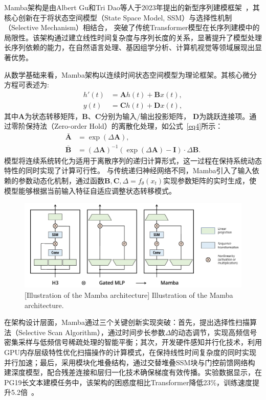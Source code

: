 Mamba架构是由Albert Gu和Tri Dao等人于2023年提出的新型序列建模框架~\cite{gu2023mamba}，其核心创新在于将状态空间模型（State Space Model, SSM）与选择性机制（Selective Mechanism）相结合，
突破了传统Transformer模型在长序列建模中的局限性。该架构通过建立线性时间复杂度与序列长度的关系，显著提升了模型处理长序列依赖的能力，在自然语言处理、基因组学分析、计算机视觉等领域展现出显著优势。

从数学基础来看，Mamba架构以连续时间状态空间模型为理论框架。其核心微分方程可表述为:
\begin{equation}
\begin{aligned}
    h'(t)&=\mathbf{A}h(t)+\mathbf{B}x(t),\\
    y(t)&=\mathbf{C}h(t) +\mathbf{D}x(t),
\end{aligned}
\label{eq3}
\end{equation}
其中$\mathbf{A}$为状态转移矩阵，$\mathbf{B}$、$\mathbf{C}$分别为输入/输出投影矩阵， $\mathbf{D}$为跳跃连接项。通过零阶保持法（Zero-order Hold）的离散化处理，如公式~\ref{eq4}所示：
\begin{equation}
\begin{aligned}
    \mathbf{\bar{A}}&=\exp(\Delta\mathbf{A}),\\
    \mathbf{\bar{B}}&=(\Delta\mathbf{A})^{-1}(\exp(\Delta\mathbf{A})-\mathbf{I})\cdot\Delta\mathbf{B}.
\end{aligned}
\label{eq4}
\end{equation}
模型将连续系统转化为适用于离散序列的递归计算形式，这一过程在保持系统动态特性的同时实现了计算可行性。
与传统递归神经网络不同，Mamba引入了输入依赖的参数动态化机制，通过函数$\mathbf{B},\mathbf{C},\Delta=f_\theta(x_t)$实现参数矩阵的实时生成，使模型能够根据当前输入特征自适应调整状态转移模式。

\begin{figure}[h]
    \centering
    \includegraphics[width=1.0\columnwidth]{figures/RelatedWork/Mamba架构.png}
    [Illustration of the Mamba architecture]{ Illustration of the Mamba architecture.~\cite{gu2023mamba}}
    \label{figure1: Mamba架构示意图}
\end{figure}
在架构设计层面，Mamba通过三个关键创新实现突破：首先，提出选择性扫描算法（Selective Scan Algorithm），通过时间步长参数$\Delta$的动态调节，实现高频信号密集采样与低频信号稀疏处理的智能平衡；其次，开发硬件感知并行化技术，利用GPU内存层级特性优化扫描操作的计算模式，在保持线性时间复杂度的同时实现并行加速；最后，采用模块化堆叠结构，通过交替堆叠SSM块与门控前馈网络构建深度模型，配合残差连接和层归一化技术确保梯度有效传播。实验数据显示，在PG19长文本建模任务中，该架构的困惑度相比Transformer降低23\%，训练速度提升5.2倍~\cite{gu2023mamba}。

